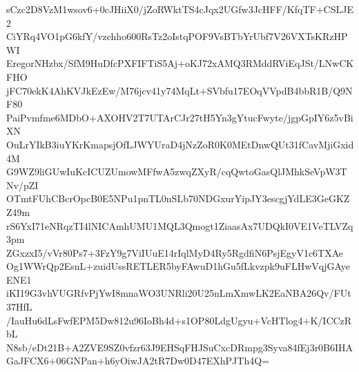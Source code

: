 sCzc2D8VzM1wsov6+0cJHiiX0/jZoRWktTS4cJqx2UGfw3JcHFF/KfqTF+CSLJE2
CiYRq4VO1pG6kfY/vzchho600RsTz2oIstqPOF9VsBTbYrUbf7V26VXTsKRzHPWI
EregorNHzbx/SfM9HuDfcPXFIFTiS5Aj+oKJ72xAMQ3RMddRViEqJSt/LNwCKFHO
jFC70ekK4AhKVJkEzEw/M76jcv41y74MqLt+SVbfu17EOqVVpdB4bbR1B/Q9NF80
PaiPvmfme6MDbO+AXOHV2T7UTArCJr27tH5Yn3gYtucFwyte/jgpGpIY6z5vBiXN
OuLrYIkB3iuYKrKmapsjOfLJWYUraD4jNzZoR0K0MEtDnwQUt31fCavMjiGxid4M
G9WZ9liGUwIuKcICUZUmowMFfwA5zwqZXyR/cqQwtoGasQlJMhkSeVpW3TNv/pZI
OTmtFUhCBcrOpcB0E5NPu1pnTL0nSLb70NDGxurYipJY3escgjYdLE3GeGKZZ49m
rS6YxI71eNRqzTI4lNICAmhUMU1MQL3Qmogt1ZiaasAx7UDQkI0VE1VeTLVZq3pm
ZGxzxI5/vVr80Ps7+3FzY9g7ViIUuE14rIqlMyD4Ry5RgdfiN6PsjEgyV1c6TXAe
Og1WWrQp2EsnL+zuidUssRETLER5byFAwuD1hGu5fLkvzpk9uFLHwVqjGAyeENE1
iKI19G3vhVUGRfvPjYwI8mnaWO3UNRli20U25nLmXmwLK2EaNBA26Qv/FUt37HfL
/IauHu6dLsFwfEPM5Dw812u96IoBh4d+s1OP80LdgUgyu+VcHTlog4+K/ICCzRbL
N8sb/eDt21B+A2ZVE9SZ0vfzr63J9EHSqFHJSuCxcDRmpg3Syva84fEj3r0B6IHA
GaJFCX6+06GNPan+h6yOiwJA2tR7Dw0D47EXhPJTh4Q=
